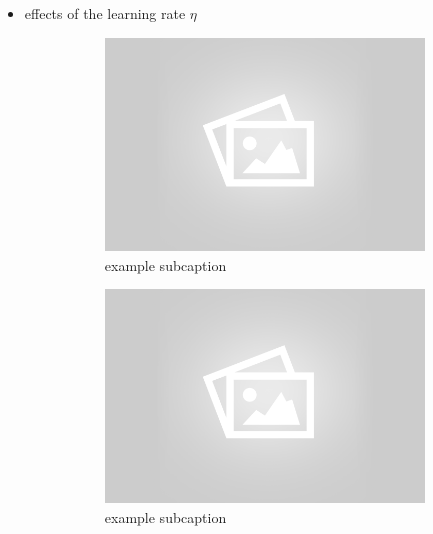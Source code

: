 \begin{itemize}

	\item effects of the learning rate $\eta$\\
		\begin{figure}[!ht]
		\centering
		\begin{subfigure}[b]{.45\textwidth}
		\centering
		\includegraphics[width=\textwidth]{mlp/placeholder.png}
		\caption{example subcaption}
		\end{subfigure}
		\quad
		\begin{subfigure}[b]{.45\textwidth}
		\centering
		\includegraphics[width=\textwidth]{mlp/placeholder.png}
		\caption{example subcaption}
		\label{fig:subfigure2}
		\end{subfigure}
		\begin{subfigure}[b]{.45\textwidth}
		\centering

\end{subfigure}
\end{figure}
\end{itemize}
